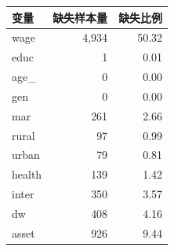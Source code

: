 \begin{tabular}{lrr}
\toprule
变量 & 缺失样本量 & 缺失比例 \\
\midrule
wage & 4,934 & 50.32 \\
educ & 1 & 0.01 \\
age\_ & 0 & 0.00 \\
gen & 0 & 0.00 \\
mar & 261 & 2.66 \\
rural & 97 & 0.99 \\
urban & 79 & 0.81 \\
health & 139 & 1.42 \\
inter & 350 & 3.57 \\
dw & 408 & 4.16 \\
asset & 926 & 9.44 \\
\bottomrule
\end{tabular}
